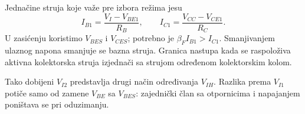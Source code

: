 Jednačine struja koje važe pre izbora režima jesu
\[I_{B1}=\frac{V_I-V_{BE1}}{R_B},\qquad I_{C1}=\frac{V_{CC}-V_{CE1}}{R_C}.\]
U zasićenju koristimo $V_{BES}$ i $V_{CES}$; potrebno je $\beta_FI_{B1}>I_{C1}$. Smanjivanjem ulaznog napona smanjuje se bazna struja. Granica nastupa kada se raspoloživa aktivna kolektorska struja izjednači sa strujom određenom kolektorskim kolom.

Tako dobijeni $V_{I2}$ predstavlja drugi način određivanja $V_{IH}$. Razlika prema $V_{I1}$ potiče samo od zamene $V_{BE}$ sa $V_{BES}$: zajednički član sa otpornicima i napajanjem poništava se pri oduzimanju.
